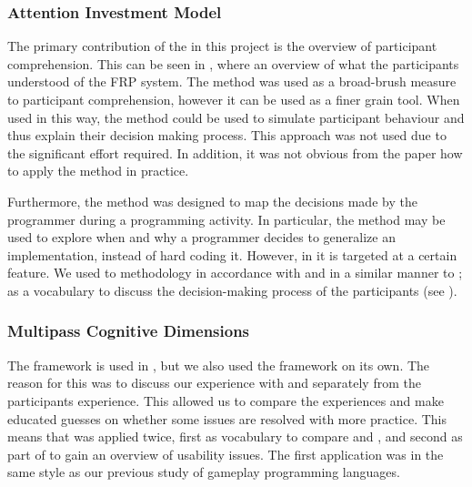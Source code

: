 \subsubsection{Attention Investment Model}
The primary contribution of the \attention in this project is the overview of participant comprehension. This can be seen in , where an overview of what the participants understood of the \gls{FRP} system. The method was used as a broad-brush measure to participant comprehension, however it can be used as a finer grain tool. When used in this way, the method could be used to simulate participant behaviour and thus explain their decision making process\cite{blackwell2002first}. This approach was not used due to the significant effort required. In addition, it was not obvious from the paper how to apply the method in practice.

Furthermore, the \attention method was designed to map the decisions made by the programmer during a programming activity. In particular, the method may be used to explore when and why a programmer decides to generalize an implementation, instead of hard coding it. However, in \champagne it is targeted at a certain feature. We used to methodology in accordance with \champagne and in a similar manner to \cognitive; as a vocabulary to discuss the decision-making  process of the participants (see ).

\subsubsection{Multipass Cognitive Dimensions}
The \cognitive framework is used in \champagne, but we also used the framework on its own. The reason for this was to discuss our experience with \fs and \cs separately from the participants experience. This allowed us to compare the experiences and make educated guesses on whether some issues are resolved with more practice. This means that \cognitive was applied twice, first as vocabulary to compare \cs and \fs, and second as part of \champagne to gain an overview of usability issues. The first application was in the same style as our previous study of gameplay programming languages\cite{p92018gameplay}.

